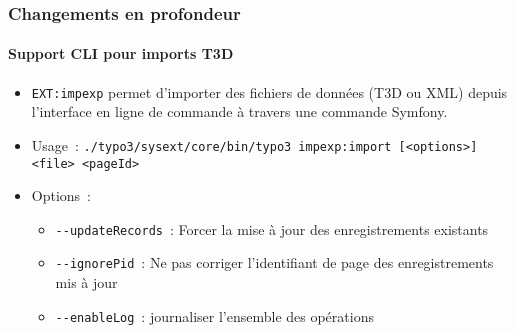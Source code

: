 \begin{frame}[fragile]
	\frametitle{Changements en profondeur}
	\framesubtitle{Support CLI pour imports T3D}

	\begin{itemize}
		\item \texttt{EXT:impexp} permet d'importer des fichiers de données (T3D ou XML)
			depuis l'interface en ligne de commande à travers une commande Symfony.

		\item Usage~:\newline
			\smaller
				\texttt{./typo3/sysext/core/bin/typo3 impexp:import [<options>] <file> <pageId>}
			\normalsize

		\item Options~:
			\begin{itemize}
				\item \texttt{-}\texttt{-updateRecords}~: Forcer la mise à jour des
					enregistrements existants
				\item \texttt{-}\texttt{-ignorePid}~: Ne pas corriger l'identifiant de page
					des enregistrements mis à jour
				\item \texttt{-}\texttt{-enableLog}~: journaliser l'ensemble des opérations
			\end{itemize}

	\end{itemize}

\end{frame}


